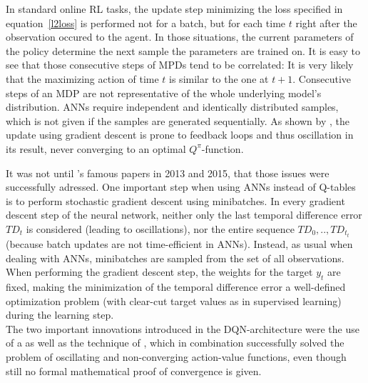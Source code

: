 In standard online RL tasks, the update step minimizing the loss specified in equation~\ref{l2loss} is performed not for a batch, but for each time $t$ right after the observation occured to the agent. 
In those situations, the current parameters of the policy determine the next sample the parameters are trained on. It is easy to see that those consecutive steps of MPDs tend to be correlated: It is very likely that the maximizing action of time $t$ is similar to the one at $t+1$. Consecutive steps of an MDP are not representative of the whole underlying model's distribution. ANNs require independent and identically distributed samples, which is not given if the samples are generated sequentially. As shown by \cite{john_n._tsitsiklis_analysis_1997}, the update using gradient descent is prone to feedback loops and thus oscillation in its result, never converging to an optimal $Q^\pi$-function. 

It was not until 's famous papers in 2013\cite{mnih_playing_2013} and 2015\cite{mnih_human-level_2015}, that those issues were successfully adressed. One important step when using ANNs instead of Q-tables is to perform stochastic gradient descent using minibatches. In every gradient descent step of the neural network, neither only the last temporal difference error $TD_t$ is considered (leading to oscillations), nor the entire sequence $TD_0, .., TD_{t_t}$ (because batch updates are not time-efficient in ANNs). Instead, as usual when dealing with ANNs, minibatches are sampled from the set of all observations. When performing the gradient descent step, the weights for the target $y_t$ are fixed, making the minimization of the temporal difference error a well-defined optimization problem (with clear-cut target values as in supervised learning) during the learning step.\\


\noindent The two important innovations introduced in the DQN-architecture were the use of a  as well as the technique of , which in combination successfully solved the problem of oscillating and non-converging action-value functions, even though still no formal mathematical proof of convergence is given. %

